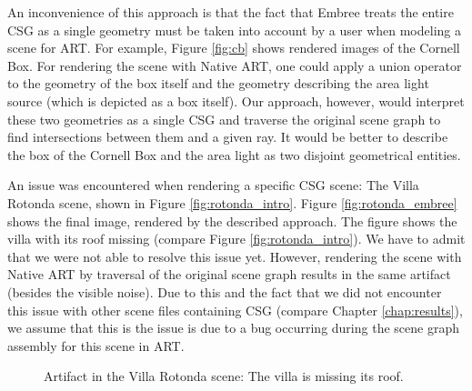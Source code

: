 An inconvenience of this approach is that the fact that Embree treats the entire CSG as a single geometry must be taken into account by a user when modeling a scene for ART. For example, Figure \ref{fig:cb} shows rendered images of the Cornell Box. For rendering the scene with Native ART, one could apply a union operator to the geometry of the box itself and the geometry describing the area light source (which is depicted as a box itself). Our approach, however, would interpret these two geometries as a single CSG and traverse the original scene graph to find intersections between them and a given ray. It would be better to describe the box of the Cornell Box and the area light as two disjoint geometrical entities.


An issue was encountered when rendering a specific CSG scene: The Villa Rotonda scene, shown in Figure \ref{fig:rotonda_intro}. Figure \ref{fig:rotonda_embree} shows the final image, rendered by the described approach. The figure shows the villa with its roof missing (compare Figure \ref{fig:rotonda_intro}). We have to admit that we were not able to resolve this issue yet. However, rendering the scene with Native ART by traversal of the original scene graph results in the same artifact (besides the visible noise). Due to this and the fact that we did not encounter this issue with other scene files containing CSG (compare Chapter \ref{chap:results}), we assume that this is the issue is due to a bug occurring during the scene graph assembly for this scene in ART.

\begin{figure}
	\centering
	\hfil
	\caption{Artifact in the Villa Rotonda scene: The villa is missing its roof.}
	\label{fig:rotonda}
\end{figure}


